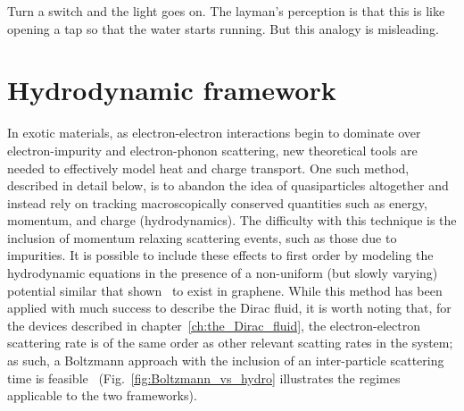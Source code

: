 \begin{savequote}[75mm]
Turn a switch and the light goes on. The layman's perception is that this is like opening a tap so that the water starts running. But this analogy is misleading.
\end{savequote}

\chapter{Hydrodynamic framework}
\label{ch:hydrodynamic_framework}

In exotic materials, as electron-electron interactions begin to dominate over electron-impurity and electron-phonon scattering, new theoretical tools are needed to effectively model heat and charge transport. One such method, described in detail below, is to abandon the idea of quasiparticles altogether and instead rely on tracking macroscopically conserved quantities such as energy, momentum, and charge (hydrodynamics). The difficulty with this technique is the inclusion of momentum relaxing scattering events, such as those due to impurities. It is possible to include these effects to first order by modeling the hydrodynamic equations in the presence of a non-uniform (but slowly varying) potential similar that shown~\cite{xue_scanning_2011} to exist in graphene. While this method has been applied with much success to describe the Dirac fluid, it is worth noting that, for the devices described in chapter~\ref{ch:the_Dirac_fluid}, the electron-electron scattering rate is of the same order as other relevant scatting rates in the system; as such, a Boltzmann approach with the inclusion of an inter-particle scattering time is feasible~\cite{adam_theoretical_2017} (Fig.~\ref{fig:Boltzmann_vs_hydro} illustrates the regimes applicable to the two frameworks).

